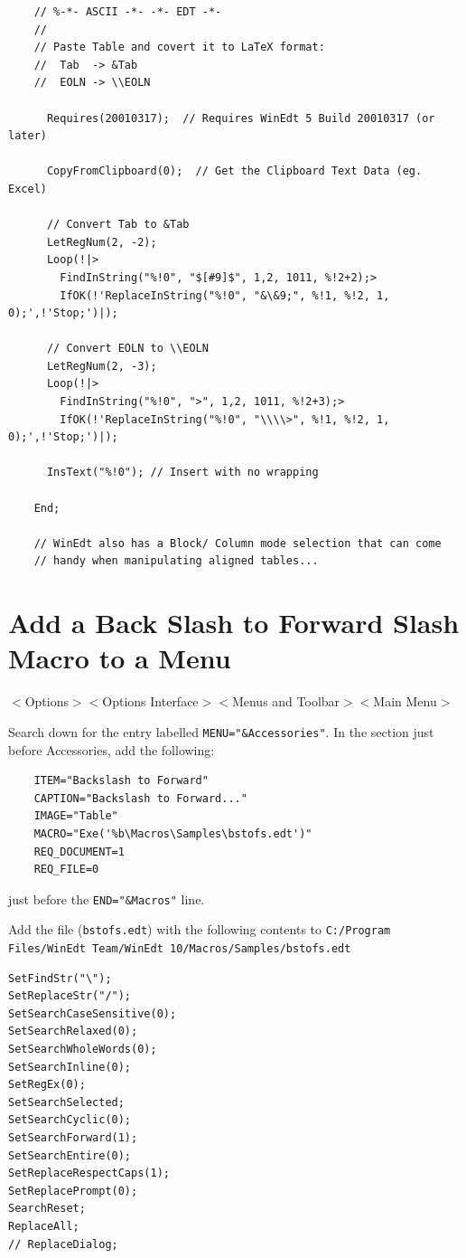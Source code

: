 \begin{lstlisting}
    // %-*- ASCII -*- -*- EDT -*-
    //
    // Paste Table and covert it to LaTeX format:
    //  Tab  -> &Tab
    //  EOLN -> \\EOLN

      Requires(20010317);  // Requires WinEdt 5 Build 20010317 (or later)

      CopyFromClipboard(0);  // Get the Clipboard Text Data (eg. Excel)

      // Convert Tab to &Tab
      LetRegNum(2, -2);
      Loop(!|>
        FindInString("%!0", "$[#9]$", 1,2, 1011, %!2+2);>
        IfOK(!'ReplaceInString("%!0", "&\&9;", %!1, %!2, 1, 0);',!'Stop;')|);

      // Convert EOLN to \\EOLN
      LetRegNum(2, -3);
      Loop(!|>
        FindInString("%!0", ">", 1,2, 1011, %!2+3);>
        IfOK(!'ReplaceInString("%!0", "\\\\>", %!1, %!2, 1, 0);',!'Stop;')|);

      InsText("%!0"); // Insert with no wrapping

    End;

    // WinEdt also has a Block/ Column mode selection that can come
    // handy when manipulating aligned tables...
\end{lstlisting}




\section{Add a Back Slash to Forward Slash Macro to a Menu}
\label{sec:bsfs}

$<$Options$>$$<$Options Interface$>$$<$Menus and Toolbar$>$$<$Main Menu$>$

Search down for the entry labelled \lstinline{MENU="&Accessories"}.
In the section just before Accessories, add the following:
\begin{lstlisting}
    ITEM="Backslash to Forward"
    CAPTION="Backslash to Forward..."
    IMAGE="Table"
    MACRO="Exe('%b\Macros\Samples\bstofs.edt')"
    REQ_DOCUMENT=1
    REQ_FILE=0
\end{lstlisting}
just before the \lstinline{END="&Macros"} line.

Add the file (\lstinline{bstofs.edt}) with the following contents to
\lstinline{C:/Program Files/WinEdt Team/WinEdt 10/Macros/Samples/bstofs.edt}

\begin{lstlisting}
SetFindStr("\");
SetReplaceStr("/");
SetSearchCaseSensitive(0);
SetSearchRelaxed(0);
SetSearchWholeWords(0);
SetSearchInline(0);
SetRegEx(0);
SetSearchSelected;
SetSearchCyclic(0);
SetSearchForward(1);
SetSearchEntire(0);
SetReplaceRespectCaps(1);
SetReplacePrompt(0);
SearchReset;
ReplaceAll;
// ReplaceDialog;
\end{lstlisting}



